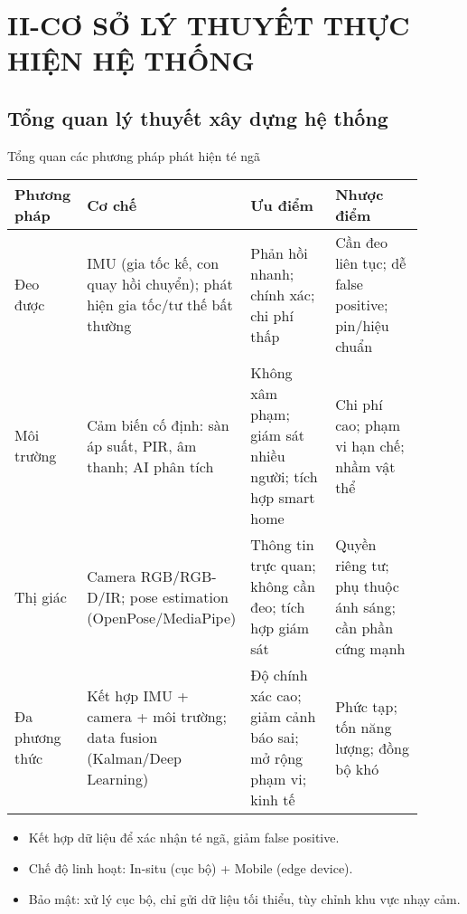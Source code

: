 \section{II-CƠ SỞ LÝ THUYẾT THỰC HIỆN HỆ THỐNG}
\subsection{Tổng quan lý thuyết xây dựng hệ thống}
\begin{frame}{Tổng quan các phương pháp phát hiện té ngã}
\scriptsize
\begin{tabular}{|p{0.18\linewidth}|p{0.22\linewidth}|p{0.25\linewidth}|p{0.25\linewidth}|}
\hline
\textbf{Phương pháp} & \textbf{Cơ chế} & \textbf{Ưu điểm} & \textbf{Nhược điểm} \\
\hline
Đeo được & IMU (gia tốc kế, con quay hồi chuyển); phát hiện gia tốc/tư thế bất thường & Phản hồi nhanh; chính xác; chi phí thấp & Cần đeo liên tục; dễ false positive; pin/hiệu chuẩn \\
\hline
Môi trường & Cảm biến cố định: sàn áp suất, PIR, âm thanh; AI phân tích & Không xâm phạm; giám sát nhiều người; tích hợp smart home & Chi phí cao; phạm vi hạn chế; nhầm vật thể \\
\hline
Thị giác & Camera RGB/RGB-D/IR; pose estimation (OpenPose/MediaPipe) & Thông tin trực quan; không cần đeo; tích hợp giám sát & Quyền riêng tư; phụ thuộc ánh sáng; cần phần cứng mạnh \\
\hline
Đa phương thức & Kết hợp IMU + camera + môi trường; data fusion (Kalman/Deep Learning) & Độ chính xác cao; giảm cảnh báo sai; mở rộng phạm vi; kinh tế & Phức tạp; tốn năng lượng; đồng bộ khó \\
\hline
\end{tabular}

\vspace{0.3em}
\begin{itemize}\scriptsize
    \item Kết hợp dữ liệu để xác nhận té ngã, giảm false positive.  
    \item Chế độ linh hoạt: In-situ (cục bộ) + Mobile (edge device).  
    \item Bảo mật: xử lý cục bộ, chỉ gửi dữ liệu tối thiểu, tùy chỉnh khu vực nhạy cảm.
\end{itemize}
\end{frame}

